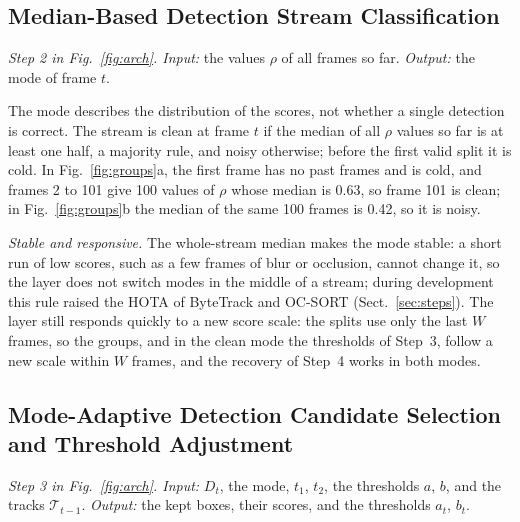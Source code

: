 \subsection{Median-Based Detection Stream Classification}\label{sec:regimes}
\emph{Step 2 in Fig.~\ref{fig:arch}. Input:} the values $\rho$ of all frames so far. \emph{Output:} the mode of frame $t$.

The mode describes the distribution of the scores, not whether a single detection is correct. The
stream is clean at frame $t$ if the median of all $\rho$ values so far is at least one half, a
majority rule, and noisy otherwise; before the first valid split it is cold. In
Fig.~\ref{fig:groups}a, the first frame has no past frames and is cold, and frames 2 to 101 give 100
values of $\rho$ whose median is 0.63, so frame 101 is clean; in Fig.~\ref{fig:groups}b the median of
the same 100 frames is 0.42, so it is noisy.

\emph{Stable and responsive.} The whole-stream median makes the mode stable: a short run of low
scores, such as a few frames of blur or occlusion, cannot change it, so the layer does not switch
modes in the middle of a stream; during development this rule raised the HOTA of ByteTrack and
OC-SORT (Sect.~\ref{sec:steps}). The layer still responds quickly to a new score scale: the splits
use only the last $W$ frames, so the groups, and in the clean mode the thresholds of Step~3, follow
a new scale within $W$ frames, and the recovery of Step~4 works in both modes.

\subsection{Mode-Adaptive Detection Candidate Selection and Threshold Adjustment}\label{sec:choice}
\emph{Step 3 in Fig.~\ref{fig:arch}. Input:} $D_t$, the mode, $t_1$, $t_2$, the thresholds $a$, $b$, and the tracks
$\mathcal{T}_{t-1}$. \emph{Output:} the kept boxes, their scores, and the thresholds $a_t$, $b_t$.


